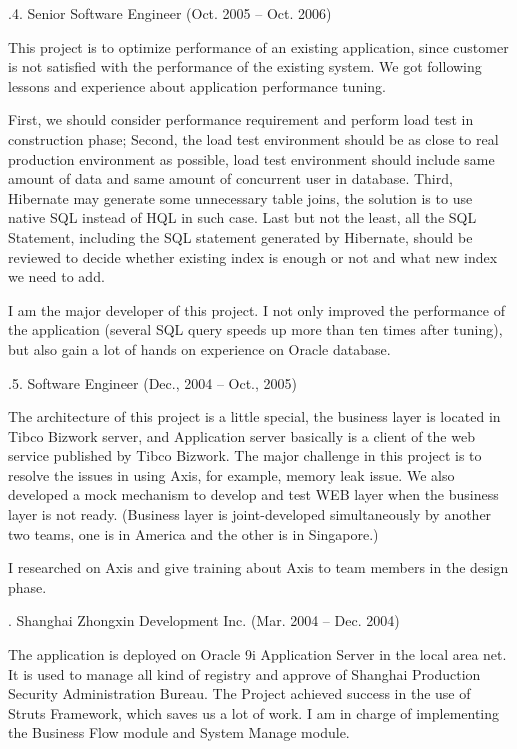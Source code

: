 .4. Senior Software Engineer (Oct. 2005 -- Oct. 2006)\par
\noindent
This project is to optimize performance of an existing application, 
since customer is not satisfied with the performance of the existing system. 
We got following lessons and experience about application performance tuning. 

First, we should consider performance requirement and perform load test in construction phase; 
Second, the load test environment should be as close to real production environment as possible,
load test environment should include same amount of data and same amount of concurrent user in database. 
Third, Hibernate may generate some unnecessary table joins, the solution
is to use native SQL instead of HQL in such case. 
Last but not the least, all the SQL Statement, including the SQL statement 
generated by Hibernate, should be reviewed to decide whether existing index 
is enough or not and what new index we need to add. 

I am the major developer of this project. I not only improved the performance
of the application (several SQL query speeds up more than ten times after tuning),
but also gain a lot of hands on experience on Oracle database.


.5. Software Engineer (Dec., 2004 -- Oct., 2005)\par
\noindent
The architecture of this project is a little special, the business layer is located 
in Tibco Bizwork server, and Application server  basically is a client of the 
web service published by Tibco Bizwork. The major challenge in this project 
is to resolve the issues in using Axis, for example, memory leak issue. 
We also developed a mock mechanism to develop and test WEB layer when the
 business layer is not ready. (Business layer is joint-developed simultaneously 
 by another two teams, one is in America and the other is in Singapore.)

I researched on Axis and give training about Axis to team members in the design phase. 

. Shanghai Zhongxin Development Inc. (Mar. 2004 -- Dec. 2004)\par

\noindent
The application is deployed on Oracle 9i Application Server in the local area net. 
It is used to manage all kind of  registry and approve of Shanghai Production 
Security Administration Bureau. The Project achieved success in the use of Struts 
Framework, which saves us a lot of work. I am in charge of implementing the 
Business Flow module and System Manage module. 

